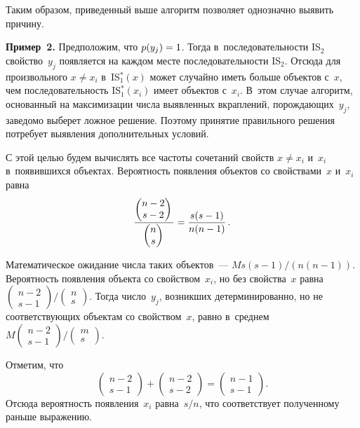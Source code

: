 \begin{multicols}{2}
  Таким образом, приведенный выше алгоритм позволяет однозначно выявить 
причину.
  
  \bigskip
  
  \noindent
  \textbf{Пример~2.} Предположим, что $p(y_j)\hm=1$. Тогда 
в~последовательности IS$_2$ свойство~$y_j$ появляется на каждом месте 
последовательности IS$_2$.  Отсюда для произвольного $x\not= x_i$ в~IS$_1^* 
(x)$ может случайно иметь больше объектов с~$x$, чем последовательность 
IS$_1^* (x_i)$ имеет объектов с~$x_i$. В~этом случае алгоритм, основанный на 
максимизации числа выявленных вкраплений, порождающих~$y_j$, заведомо 
выберет ложное решение. Поэтому принятие правильного решения потребует 
выявления дополнительных условий.
  
  С этой целью будем вычислять все частоты сочетаний свойств $x\not= x_i$ 
и~$x_i$ в~появившихся объектах. Вероятность появления объектов  со 
свойствами~$x$ и~$x_i$ равна 
  $$
  \displaystyle\frac{\displaystyle \begin{pmatrix}
  n-2\\ s-2\end{pmatrix}\mathstrut}{\displaystyle \begin{pmatrix}
  n\\ s \end{pmatrix}
  \mathstrut} =\displaystyle\frac{\displaystyle s(s-1)\mathstrut}{\displaystyle n(n-1)\mathstrut}\,.
  $$
  
  Математическое ожидание числа таких объектов~--- $Ms(s-1)/(n(n-1))$. 
Вероятность появления объекта со свойством~$x_i$, но без свойства~$x$ равна 
  $\begin{pmatrix}
  n-2\\ s-1 \end{pmatrix}/\begin{pmatrix}
  n\\ s\end{pmatrix}.
  $
     Тогда число~$y_j$, возникших детерминированно, но не соответствующих 
объектам со свойством~$x$, равно в~среднем
  $M\begin{pmatrix}
  n-2\\ s-1
  \end{pmatrix}/ \begin{pmatrix}
  m\\ s\end{pmatrix}.$

Отметим, что 
$$
\begin{pmatrix}
n-2\\ s-1\end{pmatrix} +
\begin{pmatrix}
n-2\\ s-2\end{pmatrix} =
\begin{pmatrix}
n-1\\ s-1\end{pmatrix}.
$$
Отсюда вероятность появления~$x_i$ равна~$s/n$, что соответствует 
полученному раньше выражению. 


\end{multicols}
